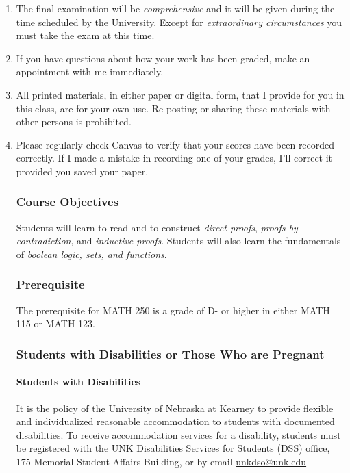 \documentclass[12pt]{article}
\newcounter{ex}\setcounter{ex}{0}
\begin{document}
\begin{enumerate}
\item The final examination will be \emph{comprehensive} and it will be given 
during the 
time scheduled by the University. Except for \emph{extraordinary circumstances}
you must take the exam at this time.


 
\item If you have questions about how your work has been graded, make an appointment with me immediately.

\item All printed materials, in either paper or digital form, that I 
provide for you in this class, are for your own use. Re-posting or 
sharing these materials with other persons is prohibited. 

\item Please regularly check Canvas  to verify that your scores have 
been recorded correctly.  If I made a mistake in recording one of
your grades, I'll correct it provided you saved your paper.

\subsubsection*{Course Objectives} 

\noindent Students will learn to read and to construct \emph{direct proofs}, \emph{proofs by contradiction}, and \emph{inductive proofs}.  Students will also learn the fundamentals of \emph{boolean logic, sets, and functions}.



\subsubsection*{Prerequisite}

The prerequisite for MATH 250 is a grade of D- or higher in either MATH 115 or MATH 123.

\subsubsection*{Students with Disabilities or Those Who are Pregnant}

\paragraph{Students with Disabilities} It is the policy of the University of Nebraska 
at Kearney to provide flexible and individualized reasonable 
accommodation to students with documented disabilities. To receive 
accommodation services for a disability, students must be
registered with the UNK Disabilities Services for Students (DSS) 
office, 175 Memorial Student Affairs Building, 
 or 
by email \href{mailto:unkdso@unk.edu}{unkdso@unk.edu}


\end{enumerate}
\end{document}
